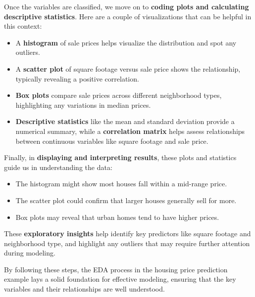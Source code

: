 \documentclass[
  letterpaper,
  DIV=11,
  numbers=noendperiod]{scrreprt}
\providecommand{\tightlist}{%
  \setlength{\itemsep}{0pt}\setlength{\parskip}{0pt}}\usepackage{longtable,booktabs,array}
\begin{document}
Once the variables are classified, we move on to \textbf{coding plots
and calculating descriptive statistics}. Here are a couple of
visualizations that can be helpful in this context:

\begin{itemize}
\tightlist
\item
  A \textbf{histogram} of sale prices helps visualize the distribution
  and spot any outliers.
\item
  A \textbf{scatter plot} of square footage versus sale price shows the
  relationship, typically revealing a positive correlation.
\item
  \textbf{Box plots} compare sale prices across different neighborhood
  types, highlighting any variations in median prices.
\item
  \textbf{Descriptive statistics} like the mean and standard deviation
  provide a numerical summary, while a \textbf{correlation matrix} helps
  assess relationships between continuous variables like square footage
  and sale price.
\end{itemize}

Finally, in \textbf{displaying and interpreting results}, these plots
and statistics guide us in understanding the data:

\begin{itemize}
\tightlist
\item
  The histogram might show most houses fall within a mid-range price.
\item
  The scatter plot could confirm that larger houses generally sell for
  more.
\item
  Box plots may reveal that urban homes tend to have higher prices.
\end{itemize}

These \textbf{exploratory insights} help identify key predictors like
square footage and neighborhood type, and highlight any outliers that
may require further attention during modeling.

By following these steps, the EDA process in the housing price
prediction example lays a solid foundation for effective modeling,
ensuring that the key variables and their relationships are well
understood.
\end{document}
